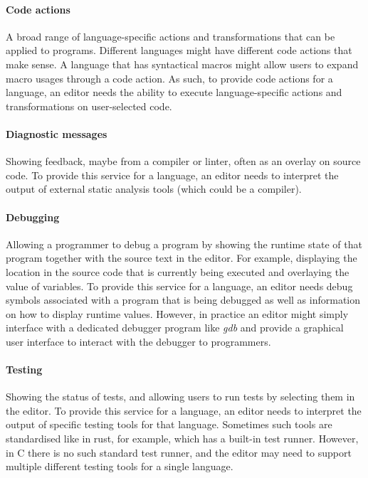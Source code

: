 \paragraph{Code actions}
A broad range of language-specific actions and transformations that can be applied to programs.
Different languages might have different code actions that make sense.
A language that has syntactical macros might allow users to expand macro usages through a code action.
As such, to provide code actions for a language, an editor needs the ability to execute language-specific actions and transformations on user-selected code.

\paragraph{Diagnostic messages}
Showing feedback, maybe from a compiler or linter, often as an overlay on source code.
To provide this service for a language, an editor needs to interpret the output of external static analysis tools (which could be a compiler).

\paragraph{Debugging}
Allowing a programmer to debug a program by showing the runtime state of that program together with the source text in the editor.
For example, displaying the location in the source code that is currently being executed and overlaying the value of variables.
To provide this service for a language, an editor needs debug symbols associated with a program that is being debugged as well as information on how to display runtime values.
However, in practice an editor might simply interface with a dedicated debugger program like \emph{gdb} and provide a graphical user interface to interact with the debugger to programmers.

\paragraph{Testing}
Showing the status of tests, and allowing users to run tests by selecting them in the editor.
To provide this service for a language, an editor needs to interpret the output of specific testing tools for that language.
Sometimes such tools are standardised like in rust, for example, which has a built-in test runner.
However, in C there is no such standard test runner, and the editor may need to support multiple different testing tools for a single language.

